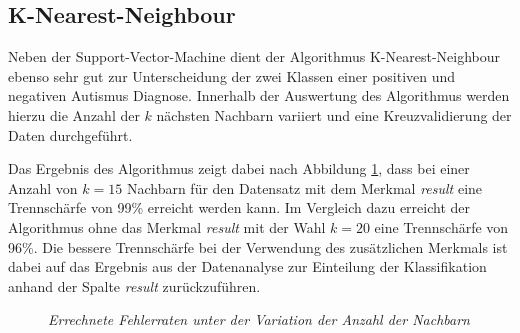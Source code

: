 \subsection{K-Nearest-Neighbour} \label{sec:kneighbour}
Neben der Support-Vector-Machine dient der Algorithmus K-Nearest-Neighbour ebenso sehr gut zur Unterscheidung der zwei Klassen einer positiven und negativen Autismus Diagnose. Innerhalb der Auswertung des Algorithmus werden hierzu die Anzahl der $k$ nächsten Nachbarn variiert und eine Kreuzvalidierung der Daten durchgeführt.

Das Ergebnis des Algorithmus zeigt dabei nach Abbildung \ref{fig:k_neighbours}, dass bei einer Anzahl von $k=15$ Nachbarn für den Datensatz mit dem Merkmal \textit{result} eine Trennschärfe von 99\% erreicht werden kann. Im Vergleich dazu erreicht der Algorithmus ohne das Merkmal \textit{result} mit der Wahl $k=20$ eine Trennschärfe von 96\%. Die bessere Trennschärfe bei der Verwendung des zusätzlichen Merkmals ist dabei auf das Ergebnis aus der Datenanalyse zur Einteilung der Klassifikation anhand der Spalte \textit{result} zurückzuführen.

\begin{figure}[h!]
\centering

\caption{\em Errechnete Fehlerraten unter der Variation der Anzahl der Nachbarn}
\label{fig:k_neighbours}
\end{figure}
